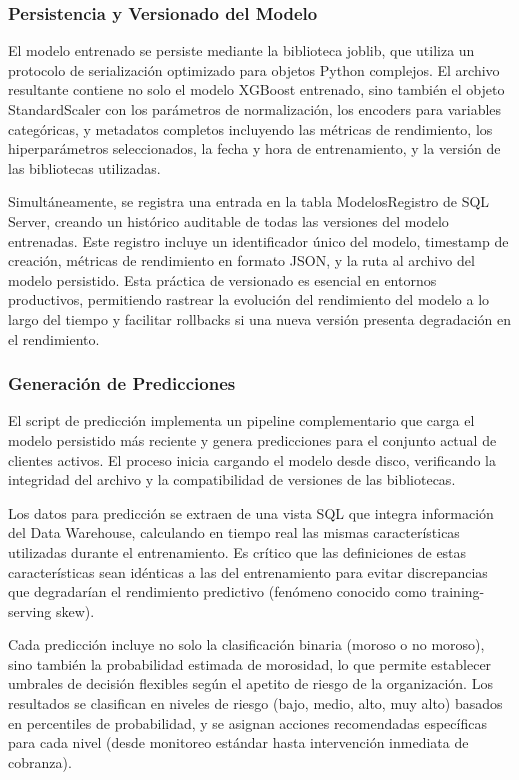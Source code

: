 \subsubsection{Persistencia y Versionado del Modelo}

El modelo entrenado se persiste mediante la biblioteca joblib, que utiliza un protocolo de serialización optimizado para objetos Python complejos. El archivo resultante contiene no solo el modelo XGBoost entrenado, sino también el objeto StandardScaler con los parámetros de normalización, los encoders para variables categóricas, y metadatos completos incluyendo las métricas de rendimiento, los hiperparámetros seleccionados, la fecha y hora de entrenamiento, y la versión de las bibliotecas utilizadas.

Simultáneamente, se registra una entrada en la tabla ModelosRegistro de SQL Server, creando un histórico auditable de todas las versiones del modelo entrenadas. Este registro incluye un identificador único del modelo, timestamp de creación, métricas de rendimiento en formato JSON, y la ruta al archivo del modelo persistido. Esta práctica de versionado es esencial en entornos productivos, permitiendo rastrear la evolución del rendimiento del modelo a lo largo del tiempo y facilitar rollbacks si una nueva versión presenta degradación en el rendimiento.

\subsubsection{Generación de Predicciones}

El script de predicción implementa un pipeline complementario que carga el modelo persistido más reciente y genera predicciones para el conjunto actual de clientes activos. El proceso inicia cargando el modelo desde disco, verificando la integridad del archivo y la compatibilidad de versiones de las bibliotecas.

Los datos para predicción se extraen de una vista SQL que integra información del Data Warehouse, calculando en tiempo real las mismas características utilizadas durante el entrenamiento. Es crítico que las definiciones de estas características sean idénticas a las del entrenamiento para evitar discrepancias que degradarían el rendimiento predictivo (fenómeno conocido como training-serving skew).

Cada predicción incluye no solo la clasificación binaria (moroso o no moroso), sino también la probabilidad estimada de morosidad, lo que permite establecer umbrales de decisión flexibles según el apetito de riesgo de la organización. Los resultados se clasifican en niveles de riesgo (bajo, medio, alto, muy alto) basados en percentiles de probabilidad, y se asignan acciones recomendadas específicas para cada nivel (desde monitoreo estándar hasta intervención inmediata de cobranza).

